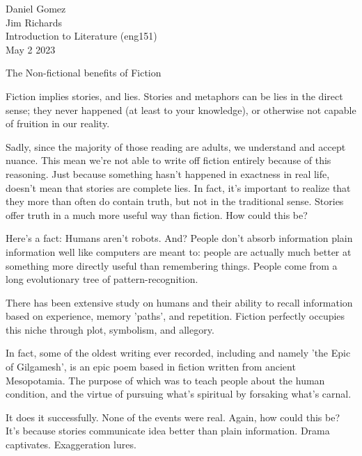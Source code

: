 \documentclass[12pt]{article}
\begin{document}
\begin{flushleft}

Daniel Gomez\\
Jim Richards\\
Introduction to Literature (eng151)\\
May 2 2023\\


\begin{center}
The Non-fictional benefits of Fiction
\end{center}


\setlength{\parindent}{0.5in}

Fiction implies stories, and lies. Stories and metaphors can be lies in the direct sense; they never happened (at least to your knowledge), or otherwise not capable of fruition in our reality. 

Sadly, since the majority of those reading are adults, we understand and accept nuance. This mean we're not able to write off fiction entirely because of this reasoning. Just because something hasn't happened in exactness in real life, doesn't mean that stories are complete lies. In fact, it's important to realize that they more than often do contain truth, but not in the traditional sense. Stories offer truth in a much more useful way than fiction. How could this be? 

Here's a fact: Humans aren't robots. And? People don't absorb information plain information well like computers are meant to: people are actually much better at something more directly useful than remembering things. People come from a long evolutionary tree of pattern-recognition.

There has been extensive study on humans and their ability to recall information based on experience, memory 'paths', and repetition. Fiction perfectly occupies this niche through plot, symbolism, and allegory. 

In fact, some of the oldest writing ever recorded, including and namely 'the Epic of Gilgamesh', is an epic poem based in fiction written from ancient Mesopotamia.
The purpose of which was to teach people about the human condition, and the virtue of pursuing what's spiritual by forsaking what's carnal.

It does it successfully. None of the events were real. Again, how could this be? It's because stories communicate idea better than plain information. Drama captivates. Exaggeration lures.


\end{flushleft}
\end{document}
